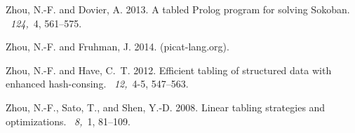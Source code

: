 \documentclass{new_tlp}
\begin{document}
\begin{thebibliography}{}
{\sc Zhou, N.-F.} {\sc and} {\sc Dovier, A.} 2013.
\newblock A tabled {Prolog} program for solving {Sokoban}.
~{\em 124,\/}~4, 561--575.

{\sc Zhou, N.-F.} {\sc and} {\sc Fruhman, J.} 2014.
 (picat-lang.org).

{\sc Zhou, N.-F.} {\sc and} {\sc Have, C.~T.} 2012.
\newblock Efficient tabling of structured data with enhanced hash-consing.
~{\em 12,\/}~4-5, 547--563.

{\sc Zhou, N.-F.}, {\sc Sato, T.}, {\sc and} {\sc Shen, Y.-D.} 2008.
\newblock Linear tabling strategies and optimizations.
~{\em 8,\/}~1, 81--109.

\end{thebibliography}
\end{document}
